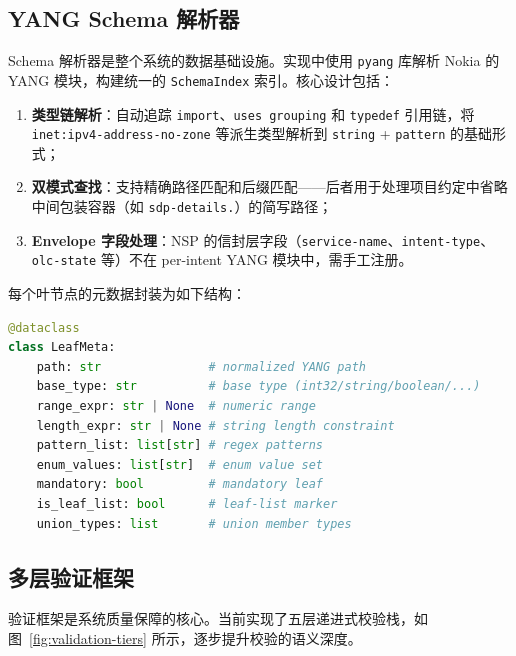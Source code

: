\documentclass[12pt, a4paper]{article}
\newcommand{\yang}{\textsc{YANG}}
\newcommand{\nsp}{\textsc{NSP}}
\begin{document}
\subsection{YANG Schema 解析器}
\label{sec:yang-parser}

Schema 解析器是整个系统的数据基础设施。实现中使用 \texttt{pyang} 库解析 Nokia 的 \yang{} 模块，构建统一的 \texttt{SchemaIndex} 索引。核心设计包括：

\begin{enumerate}
  \item \textbf{类型链解析}：自动追踪 \texttt{import}、\texttt{uses grouping} 和 \texttt{typedef} 引用链，将 \texttt{inet:ipv4-address-no-zone} 等派生类型解析到 \texttt{string} + \texttt{pattern} 的基础形式；
  \item \textbf{双模式查找}：支持精确路径匹配和后缀匹配——后者用于处理项目约定中省略中间包装容器（如 \texttt{sdp-details.}）的简写路径；
  \item \textbf{Envelope 字段处理}：\nsp{} 的信封层字段（\texttt{service-name}、\texttt{intent-type}、\texttt{olc-state} 等）不在 per-intent \yang{} 模块中，需手工注册。
\end{enumerate}

\noindent
每个叶节点的元数据封装为如下结构：

\begin{lstlisting}[language=Python, caption={LeafMeta 数据结构}]
@dataclass
class LeafMeta:
    path: str               # normalized YANG path
    base_type: str          # base type (int32/string/boolean/...)
    range_expr: str | None  # numeric range
    length_expr: str | None # string length constraint
    pattern_list: list[str] # regex patterns
    enum_values: list[str]  # enum value set
    mandatory: bool         # mandatory leaf
    is_leaf_list: bool      # leaf-list marker
    union_types: list       # union member types
\end{lstlisting}

\subsection{多层验证框架}
\label{sec:validation}

验证框架是系统质量保障的核心。当前实现了五层递进式校验栈，如图~\ref{fig:validation-tiers} 所示，逐步提升校验的语义深度。
\end{document}
